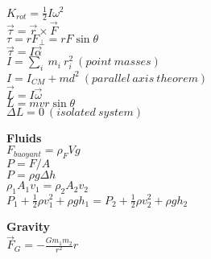 \documentclass[12pt]{article}
\begin{document}
\begin{twocolumn}
\begin{flushleft}
\medskip
$\displaystyle K_{rot} = \frac{1}{2} I \omega^2 $\\
\medskip
$\displaystyle \vec{\tau} = \vec{r} \times \vec{F}$\\
\medskip
$\displaystyle \tau = r F_{\perp} = rF \sin \theta$\\
\medskip
$\displaystyle \vec{\tau} = I \vec{\alpha} $\\
\medskip
$\displaystyle I = \sum_i \ m_i \ r_i^2  \ (point \ masses)$\\
\medskip
$\displaystyle I = I_{CM} + m d^2  \ (parallel \ axis \ theorem)$\\
\medskip
$\displaystyle \vec{L} = I \vec{\omega} $\\
\medskip
$\displaystyle L = m v r \sin \theta$\\
\medskip
$\displaystyle \Delta L = 0 \ (isolated ~ system)$\\
\medskip
\medskip

 {\bf Fluids}\\
 \medskip
 $\displaystyle F_{buoyant} = \rho_F V g $\\
 \medskip
 $\displaystyle P = F/A $\\
 \medskip
 $\displaystyle P = \rho g \Delta h $ \\
 \medskip
$\displaystyle \rho_1 A_1 v_1 = \rho_2 A_2 v_2 $ \\
\medskip
$\displaystyle  P_1 + \frac{1}{2} \rho v_1^2 + \rho g h_1 = P_2 + \frac{1}{2} \rho v_2^2 + \rho g h_2$ \\
\medskip

 \medskip
 {\bf Gravity} \\
\medskip
$\displaystyle \vec{F}_G  = -\frac{G m_1 m_2}{r^2} \hat{r}$ \\

\medskip
\medskip


\end{flushleft}
\end{twocolumn}
\end{document}
